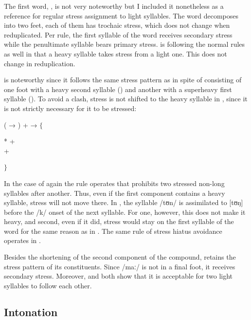 The first word, , is not very noteworthy but I 
included it nonetheless as a reference for regular stress assignment to light 
syllables. The word decomposes into two feet, each of them has trochaic stress, 
which does not change when reduplicated. Per rule, the first syllable of the 
word receives secondary stress while the penultimate syllable bears primary 
stress.  is following the normal rules as well 
in that a heavy syllable takes stress from a light one. This does not change in 
reduplication.

 is noteworthy since it follows the same stress 
pattern as  in spite of consisting of one foot with 
a heavy second syllable () and another with a superheavy 
first syllable (). To avoid a clash, stress is not shifted to 
the heavy syllable in , since it is not strictly necessary 
for it to be stressed:

\ex
	( → ) +  → 
		$\left.\Big\{\right.$\parbox{\widthof{*\fw{depàng} + 
		\fw{cā́ti}}}{* +  \\
		 + }$\left.\Big\}\right.$
\xe

In the case of  again the rule operates that 
prohibits two stressed non-long syllables after another. Thus, even if the 
first component  contains a heavy syllable, stress will not 
move there. In , the syllable /tʊn/ is assimilated
 to [tʊŋ] before the /k/ onset of the 
next syllable. For one, however, this does not make it heavy, and second, even 
if it did, stress would stay on the first syllable of the word for the same 
reason as in . The same rule of stress hiatus 
avoidance operates in .

Besides the shortening of the second component of the compound, 
 retains the stress pattern of its constituents.
Since /maː/ is not in a final foot, it receives secondary stress. Moreover,
 and  both show that 
it is acceptable for two light syllables to follow each other.


\subsection{Intonation}

